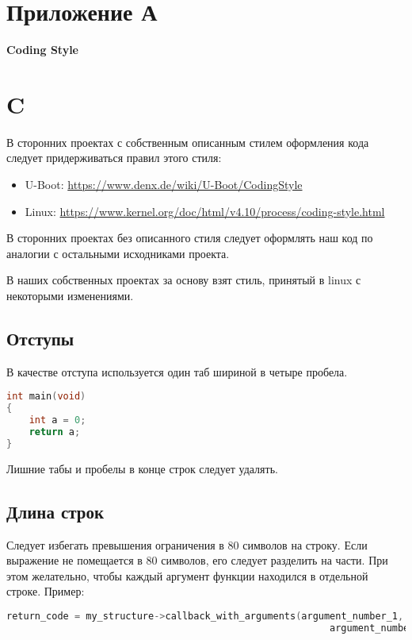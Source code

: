 \section*{Приложение А}

\begin{center}
    \textbf{Coding Style}
\end{center}

\section*{C}

В сторонних проектах с собственным описанным стилем оформления кода следует придерживаться правил этого стиля:
\begin{itemize}
    \item U-Boot: \url{https://www.denx.de/wiki/U-Boot/CodingStyle}
    \item Linux: \url{https://www.kernel.org/doc/html/v4.10/process/coding-style.html}
\end{itemize}

\linespace

В сторонних проектах без описанного стиля следует оформлять наш код по аналогии с остальными исходниками проекта.

\linespace

В наших собственных проектах за основу взят стиль, принятый в linux с некоторыми изменениями.

\subsection*{Отступы}

В качестве отступа используется один таб шириной в четыре пробела.
\begin{lstlisting}[language=C]
int main(void)
{
    int a = 0;
    return a;
}
\end{lstlisting}

Лишние табы и пробелы в конце строк следует удалять.

\subsection*{Длина строк}

Следует избегать превышения ограничения в 80 символов на строку. Если выражение не помещается в 80 символов, его следует разделить на части. При этом желательно, чтобы каждый аргумент функции находился в отдельной строке. Пример:
\begin{lstlisting}[language=C]
return_code = my_structure->callback_with_arguments(argument_number_1,
                                                         argument_number_2);
\end{lstlisting}

